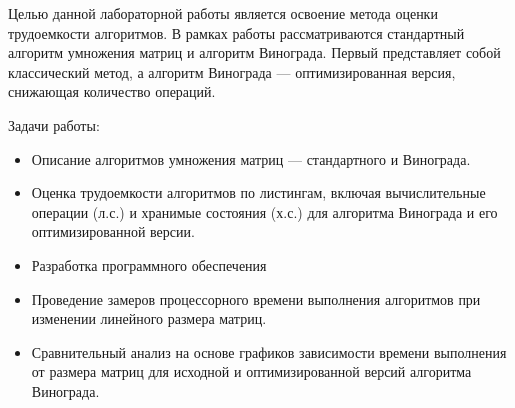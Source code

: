 
Целью данной лабораторной работы является освоение метода оценки трудоемкости алгоритмов. В рамках работы рассматриваются стандартный алгоритм умножения матриц и алгоритм Винограда. Первый представляет собой классический метод, а алгоритм Винограда — оптимизированная версия, снижающая количество операций.

Задачи работы:
\begin{itemize}
    \item Описание алгоритмов умножения матриц — стандартного и Винограда.
    \item Оценка трудоемкости алгоритмов по листингам, включая вычислительные операции (л.с.) и хранимые состояния (х.с.) для алгоритма Винограда и его оптимизированной версии.
    \item Разработка программного обеспечения
    \item Проведение замеров процессорного времени выполнения алгоритмов при изменении линейного размера матриц.
    \item Сравнительный анализ на основе графиков зависимости времени выполнения от размера матриц для исходной и оптимизированной версий алгоритма Винограда.
\end{itemize}


\clearpage
